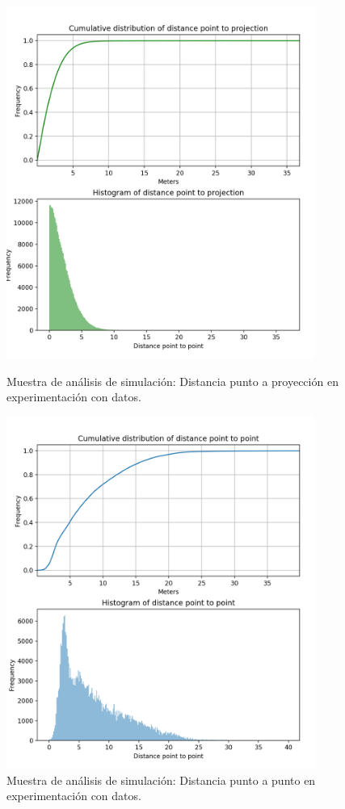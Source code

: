 \begin{figure}[!htb]
\begin{minipage}{0.48\textwidth}
\centering
\includegraphics[width=0.9\textwidth]{./Imagenes/SimulateCumulativePointProjection.png}
\caption{Muestra de análisis de simulación: Distancia punto a proyección en experimentación con datos.}
\label{figure:SimulatedPointToProjection}
\end{minipage}\hfill
\begin{minipage}{0.48\textwidth}
\centering
\includegraphics[width=0.9\textwidth]{./Imagenes/SimulateCumulativePointPoint.png}
\caption{Muestra de análisis de simulación: Distancia punto a punto en experimentación con datos.}
\label{figure:SimulatedPointToPoint}
\end{minipage}
\end{figure}

